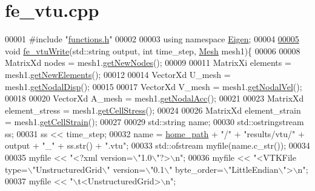\hypertarget{fe__vtu_8cpp_source}{}\section{fe\+\_\+vtu.\+cpp}
\label{fe__vtu_8cpp_source}

\begin{DoxyCode}
00001 \textcolor{preprocessor}{#include "\hyperlink{functions_8h}{functions.h}"}
00002 
00003 \textcolor{keyword}{using namespace }\hyperlink{namespace_eigen}{Eigen};
00004 
\hyperlink{fe__vtu_8cpp_a9c39148b76d7691ea87e7f2f88b02295}{00005} \textcolor{keywordtype}{void} \hyperlink{fe__vtu_8cpp_a9c39148b76d7691ea87e7f2f88b02295}{fe\_vtuWrite}(std::string output, \textcolor{keywordtype}{int} time\_step, \hyperlink{class_mesh}{Mesh} mesh1)\{
00006 
00008     MatrixXd nodes = mesh1.\hyperlink{class_mesh_a52ecce406bbef80cbf3610db3ea5ea40}{getNewNodes}();
00009 
00011     MatrixXi elements = mesh1.\hyperlink{class_mesh_a6e425e9499e64ab52c4555aa3763651d}{getNewElements}();
00012 
00014     VectorXd U\_mesh = mesh1.\hyperlink{class_mesh_a3fbc4b3c21f738efc6cdf3d02e31ad23}{getNodalDisp}();
00015 
00017     VectorXd V\_mesh = mesh1.\hyperlink{class_mesh_a052cd330cb8ccecf63e960a7afd0a6d9}{getNodalVel}();
00018 
00020     VectorXd A\_mesh = mesh1.\hyperlink{class_mesh_ad41670edd4e6335071012837a58fb725}{getNodalAcc}();
00021 
00023     MatrixXd element\_stress = mesh1.\hyperlink{class_mesh_a4ec62fd7219adcd406a167c1f6ee81e8}{getCellStress}();
00024 
00026     MatrixXd element\_strain = mesh1.\hyperlink{class_mesh_a1c54802401d00d14b390db2f0e615ebb}{getCellStrain}();
00027 
00029     std::string name;
00030     std::ostringstream ss;
00031     ss << time\_step;
00032     name = \hyperlink{_global_variables_8h_a556ce46e457f991c51f3dac111579e2b}{home\_path} + \textcolor{stringliteral}{"/"} + \textcolor{stringliteral}{"results/vtu/"} + output + \textcolor{stringliteral}{"\_"} + ss.str() + \textcolor{stringliteral}{".vtu"};
00033     std::ofstream myfile(name.c\_str());
00034 
00035     myfile << \textcolor{stringliteral}{"<?xml version=\(\backslash\)"1.0\(\backslash\)"?>\(\backslash\)n"};
00036     myfile << \textcolor{stringliteral}{"<VTKFile type=\(\backslash\)"UnstructuredGrid\(\backslash\)" version=\(\backslash\)"0.1\(\backslash\)" byte\_order=\(\backslash\)"LittleEndian\(\backslash\)">\(\backslash\)n"};
00037     myfile << \textcolor{stringliteral}{"\(\backslash\)t<UnstructuredGrid>\(\backslash\)n"};

\end{DoxyCode}
